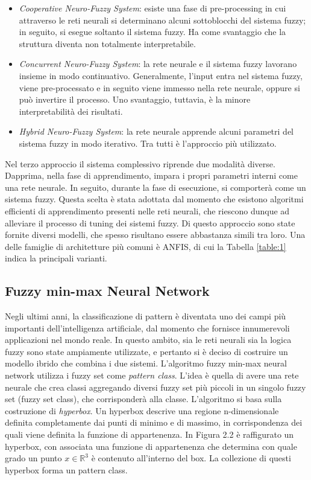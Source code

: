 \documentclass[11pt,  oneside, openany]{book}
\begin{document}
\begin{itemize}
\item \textit{Cooperative Neuro-Fuzzy System}: esiste una fase di pre-processing in cui attraverso le reti neurali si determinano alcuni sottoblocchi del sistema fuzzy; in seguito, si esegue soltanto il sistema fuzzy. Ha come svantaggio che la struttura diventa non totalmente interpretabile. 
\item \textit{Concurrent Neuro-Fuzzy System}: la rete neurale e il sistema fuzzy lavorano insieme in modo continuativo. Generalmente, l'input entra nel sistema fuzzy, viene pre-processato e in seguito viene immesso nella rete neurale, oppure si può invertire il processo. Uno svantaggio, tuttavia, è la minore interpretabilità dei risultati. 
\item \textit{Hybrid Neuro-Fuzzy System}: la rete neurale apprende alcuni parametri del sistema fuzzy in modo iterativo. Tra tutti è l'approccio più utilizzato. 
\end{itemize}

Nel terzo approccio il sistema complessivo riprende due modalità diverse. Dapprima, nella fase di apprendimento, impara i propri parametri interni come una rete neurale. In seguito, durante la fase di esecuzione, si comporterà come un sistema fuzzy. Questa scelta è stata adottata dal momento che esistono algoritmi efficienti di apprendimento presenti nelle reti neurali, che riescono dunque ad alleviare il processo di tuning dei sistemi fuzzy. Di questo approccio sono state fornite diversi modelli, che spesso risultano essere abbastanza simili tra loro. Una delle famiglie di architetture più comuni è ANFIS, di cui la Tabella \ref{table:1} indica la principali varianti. 

\subsection{Fuzzy min-max Neural Network}

Negli ultimi anni, la classificazione di pattern è diventata uno dei campi più importanti dell'intelligenza artificiale, dal momento che fornisce innumerevoli applicazioni nel mondo reale. In questo ambito, sia le reti neurali sia la logica fuzzy sono state ampiamente utilizzate, e pertanto si è deciso di costruire un modello ibrido che combina i due sistemi. 
L'algoritmo fuzzy min-max neural network utilizza i fuzzy set come \textit{pattern class}. L'idea è quella di avere una rete neurale che crea classi aggregando diversi fuzzy set più piccoli in un singolo fuzzy set (fuzzy set class), che corrisponderà alla classe. L'algoritmo si basa sulla costruzione di \textit{hyperbox}. Un hyperbox descrive una regione n-dimensionale definita completamente dai punti di minimo e di massimo, in corrispondenza dei quali viene definita la funzione di appartenenza. In Figura 2.2 è raffigurato un hyperbox, con associata una funzione di appartenenza che determina con quale grado un punto $x\in \mathbb{R}^3$ è contenuto all'interno del box. La collezione di questi hyperbox forma un pattern class. 
\end{document}
